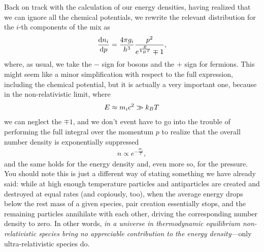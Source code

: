 Back on track with the calculation of our energy densities, having realized that
we can ignore all the chemical potentials, we rewrite the relevant distribution
for the $i$-th components of the mix as
\begin{align}
  \dv{n_i}{p}= \frac{4\pi g_i}{h^3} \frac{p^2}{e^\frac{E}{k_B T} \mp 1},
\end{align}
where, as usual, we take the $-$ sign for bosons and the $+$ sign for fermions.
This might seem like a minor simplification with respect to the full expression,
including the chemical potential, but it is actually a very important one, because
in the non-relativistic limit, where
\begin{align*}
  E \approx m_i c^2 \gg k_B T
\end{align*}
we can neglect the $\mp 1$, and we don't event have to go into the trouble of
performing the full integral over the momentum $p$ to realize that
the overall number density is exponentially suppressed
\begin{align}
  n \propto e^{-\frac{m_i}{T}},
\end{align}
and the same holds for the energy density and, even more so, for the pressure.
You should note this is just a different way of stating something we have already
said: while at high enough temperature particles and antiparticles are created and
destroyed at equal rates (and copiously, too), when the average energy drops below
the rest mass of a given species, pair creation essentially stops, and the remaining
particles annihilate with each other, driving the corresponding number density to
zero.
In other words, \emph{in a universe in thermodynamic equilibrium non-relativistic
species bring no appreciable contribution to the energy density}---only ultra-relativistic
species do.

